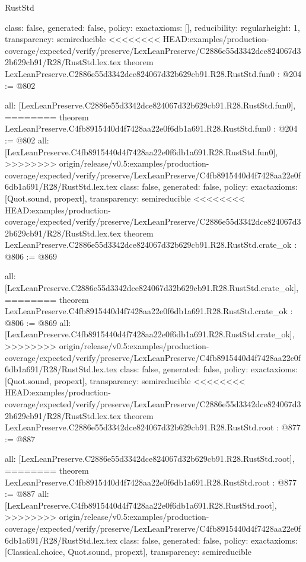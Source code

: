 \begin{lexlean}{RustStd}
\begin{coremodule}
{\begin{coremodule}
{{{  class: false,
  generated: false,
  policy: exact{axioms: []},
  reducibility: regular{height: 1},
  transparency: semireducible
}
<<<<<<<< HEAD:examples/production-coverage/expected/verify/preserve/LexLeanPreserve/C2886e55d3342dce824067d32b629cb91/R28/RustStd.lex.tex
theorem LexLeanPreserve.C2886e55d3342dce824067d32b629cb91.R28.RustStd.fun0 : @204 := @802 {
  all: [LexLeanPreserve.C2886e55d3342dce824067d32b629cb91.R28.RustStd.fun0],
========
theorem LexLeanPreserve.C4fb8915440d4f7428aa22e0f6db1a691.R28.RustStd.fun0 : @204 := @802 {
  all: [LexLeanPreserve.C4fb8915440d4f7428aa22e0f6db1a691.R28.RustStd.fun0],
>>>>>>>> origin/release/v0.5:examples/production-coverage/expected/verify/preserve/LexLeanPreserve/C4fb8915440d4f7428aa22e0f6db1a691/R28/RustStd.lex.tex
  class: false,
  generated: false,
  policy: exact{axioms: [Quot.sound, propext]},
  transparency: semireducible
}
<<<<<<<< HEAD:examples/production-coverage/expected/verify/preserve/LexLeanPreserve/C2886e55d3342dce824067d32b629cb91/R28/RustStd.lex.tex
theorem LexLeanPreserve.C2886e55d3342dce824067d32b629cb91.R28.RustStd.crate_ok : @806 := @869 {
  all: [LexLeanPreserve.C2886e55d3342dce824067d32b629cb91.R28.RustStd.crate_ok],
========
theorem LexLeanPreserve.C4fb8915440d4f7428aa22e0f6db1a691.R28.RustStd.crate_ok : @806 := @869 {
  all: [LexLeanPreserve.C4fb8915440d4f7428aa22e0f6db1a691.R28.RustStd.crate_ok],
>>>>>>>> origin/release/v0.5:examples/production-coverage/expected/verify/preserve/LexLeanPreserve/C4fb8915440d4f7428aa22e0f6db1a691/R28/RustStd.lex.tex
  class: false,
  generated: false,
  policy: exact{axioms: [Quot.sound, propext]},
  transparency: semireducible
}
<<<<<<<< HEAD:examples/production-coverage/expected/verify/preserve/LexLeanPreserve/C2886e55d3342dce824067d32b629cb91/R28/RustStd.lex.tex
theorem LexLeanPreserve.C2886e55d3342dce824067d32b629cb91.R28.RustStd.root : @877 := @887 {
  all: [LexLeanPreserve.C2886e55d3342dce824067d32b629cb91.R28.RustStd.root],
========
theorem LexLeanPreserve.C4fb8915440d4f7428aa22e0f6db1a691.R28.RustStd.root : @877 := @887 {
  all: [LexLeanPreserve.C4fb8915440d4f7428aa22e0f6db1a691.R28.RustStd.root],
>>>>>>>> origin/release/v0.5:examples/production-coverage/expected/verify/preserve/LexLeanPreserve/C4fb8915440d4f7428aa22e0f6db1a691/R28/RustStd.lex.tex
  class: false,
  generated: false,
  policy: exact{axioms: [Classical.choice, Quot.sound, propext]},
  transparency: semireducible
}

}}}}}
\end{coremodule}}
\end{coremodule}
\end{lexlean}
